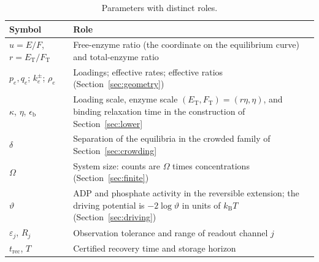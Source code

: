 \documentclass[11pt]{article}
\theoremstyle{plain}
\theoremstyle{definition}
\theoremstyle{remark}
\numberwithin{equation}{section}
\newcommand{\ET}{E_{\mathrm T}}
\newcommand{\FT}{F_{\mathrm T}}
\newcommand{\trec}{t_{\mathrm{rec}}}
\newcommand{\eb}{\epsilon_{\mathrm b}}
\newcommand{\kB}{k_{\mathrm B}}
\begin{document}
\begin{table}[tbp]
\centering\small
\caption{Parameters with distinct roles.}\label{tab:parameters}
\begin{tabularx}{\textwidth}{@{}lX@{}}
\toprule
Symbol & Role\\
\midrule
\(u=E/F\), \(r=\ET/\FT\) & Free-enzyme ratio (the coordinate on the equilibrium curve) and
total-enzyme ratio\\
\(p_e,q_e\); \(k_e^\pm\); \(\rho_e\) & Loadings; effective rates; effective ratios
(Section~\ref{sec:geometry})\\
\(\kappa\), \(\eta\), \(\eb\) & Loading scale, enzyme scale \((\ET,\FT)=(r\eta,\eta)\), and
binding relaxation time in the construction of Section~\ref{sec:lower}\\
\(\delta\) & Separation of the equilibria in the crowded family of
Section~\ref{sec:crowding}\\
\(\Omega\) & System size: counts are \(\Omega\) times concentrations
(Section~\ref{sec:finite})\\
\(\vartheta\) & ADP and phosphate activity in the reversible extension; the driving potential
is \(-2\log\vartheta\) in units of \(\kB T\) (Section~\ref{sec:driving})\\
\(\varepsilon_j\), \(R_j\) & Observation tolerance and range of readout channel \(j\)\\
\(\trec\), \(T\) & Certified recovery time and storage horizon\\
\bottomrule
\end{tabularx}
\end{table}





\appendix




\end{document}
